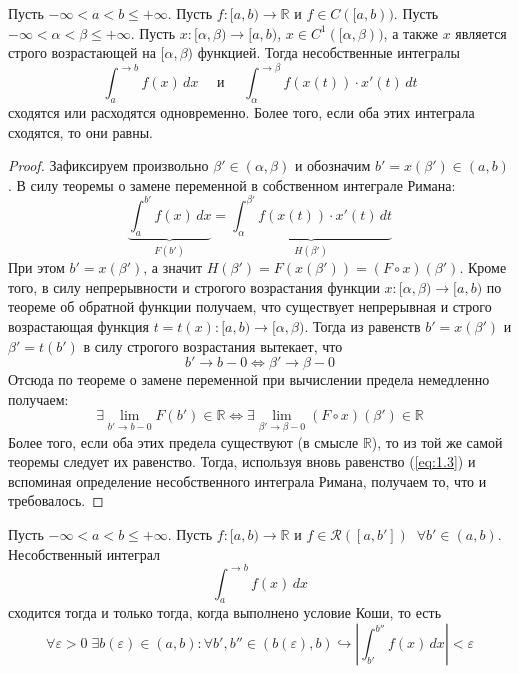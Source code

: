 \documentclass[11pt]{article}
\begin{document}
\begin{theorem}
    Пусть $- \infty < a < b \leq + \infty$. Пусть $f \colon [a, b) \to \mathbb{R}$ и $f \in C([a, b))$. Пусть $- \infty < \alpha < \beta \leq + \infty$. Пусть $x \colon [\alpha, \beta) \to [a, b)$, $x \in C^{1}([\alpha, \beta))$, а также $x$ является строго возрастающей на $[\alpha, \beta)$ функцией. Тогда несобственные интегралы 
    \[\int_{a}^{\to b} f(x) \, dx \quad \text{ и } \quad \int_{\alpha}^{\to \beta} f(x(t)) \cdot x'(t) \, dt\]
    сходятся или расходятся одновременно. Более того, если оба этих интеграла сходятся, то они равны.
\end{theorem}

\begin{proof}
    Зафиксируем произвольно $\beta' \in (\alpha, \beta)$ и обозначим $b' = x(\beta') \in (a, b)$. В силу теоремы о замене переменной в собственном интеграле Римана:
    \begin{equation*} \label{eq:1.3} \tag{$\star$}
        \underbrace{\int_{a}^{b'} f(x) \, dx}_{F(b')} = \underbrace{\int_{\alpha}^{\beta'} f(x(t)) \cdot x'(t) \, dt}_{H(\beta')}
    \end{equation*}
    При этом $b' = x(\beta')$, а значит $H(\beta') = F(x(\beta')) = (F \circ x) (\beta')$. Кроме того, в силу непрерывности и строгого возрастания функции $x \colon [\alpha, \beta) \to [a, b)$ по теореме об обратной функции получаем, что существует непрерывная и строго возрастающая функция $t = t(x) \colon [a, b) \to [\alpha, \beta)$. Тогда из равенств $b' = x(\beta')$ и $\beta' = t(b')$ в силу строгого возрастания вытекает, что 
    \[b' \to b - 0 \iff \beta' \to \beta - 0\]
    Отсюда по теореме о замене переменной при вычислении предела немедленно получаем:
    \[\exists \lim_{b' \to b - 0} F(b') \in \mathbb{R} \iff \exists \lim_{\beta' \to \beta - 0} (F \circ x) (\beta') \in \mathbb{R}\]
    Более того, если оба этих предела существуют (в смысле $\mathbb{R}$), то из той же самой теоремы следует их равенство. Тогда, используя вновь равенство (\ref{eq:1.3}) и вспоминая определение несобственного интеграла Римана, получаем то, что и требовалось.
\end{proof}

\begin{theorem}
    Пусть $- \infty < a < b \leq + \infty$. Пусть $f \colon [a, b) \to \mathbb{R}$ и $f \in \mathcal{R}([a, b']) \; \; \forall b' \in (a, b)$. Несобственный интеграл 
    \[\int_{a}^{\to b} f(x) \, dx\]
    сходится тогда и только тогда, когда выполнено условие Коши, то есть 
    \[\forall \varepsilon > 0 \; \exists b(\varepsilon) \in (a, b) : \forall b', b'' \in (b(\varepsilon), b) \hookrightarrow \left\lvert \int_{b'}^{b''} f(x) \, dx \right\rvert < \varepsilon\]
\end{theorem}
\end{document}
